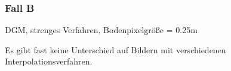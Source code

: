 \documentclass[12pt]{article}
\begin{document}
\subsubsection{Fall B}
DGM, strenges Verfahren, Bodenpixelgröße = 0.25m 
\begin{figure}[ht]\centering
\end{figure}
\newline
Es gibt fast keine Unterschied auf Bildern mit verschiedenen Interpolationsverfahren. 
\newpage
\end{document}
